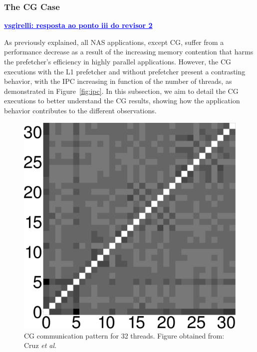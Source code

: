 \documentclass[AMA,final,STIX1COL]{WileyNJD-v2}
\newcommand{\vsg}[1]{\textcolor{blue}{\bfseries \ul{vsgirelli: #1} }\vspace{0.2cm}}
\newcommand{\fbm}[1]{\textcolor{red}{\bfseries \ul{fbm: #1} }\vspace{0.2cm}}
\begin{document}
\subsubsection{The CG Case}\label{subs:cg}

\vsg{resposta ao ponto iii do revisor 2}

As previously explained, all NAS applications, except CG, suffer from a performance decrease as a result of the increasing memory contention that harms the prefetcher's efficiency in highly parallel applications.
However, the CG executions with the L1 prefetcher and without prefetcher present a contrasting behavior, with the IPC increasing in function of the number of threads, as demonstrated in Figure~\ref{fig:ipc}.
In this subsection, we aim to detail the CG executions to better understand the CG results, showing how the application behavior contributes to the different observations. %


\begin{figure}[!htb]
    \centering
    \includegraphics[width=.3\linewidth]{figures/cg.pdf}
    \caption{CG communication pattern for 32 threads. Figure obtained from: Cruz \textit{et al.}~\cite{cruz2018thread}}
    \label{fig:figcomma}
\end{figure}
\end{document}
